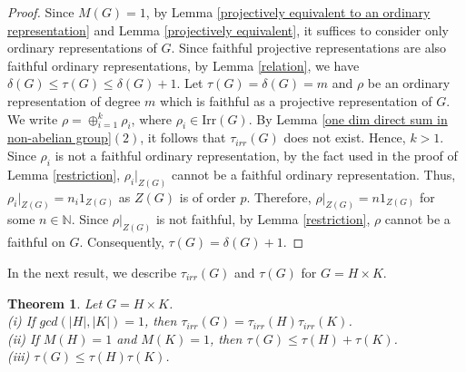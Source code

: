 \documentclass[a4paper,11pt]{amsart}
\numberwithin{equation}{section}
\numberwithin{equation}{subsection}
\newtheorem{theorem}{Theorem}[section]
\newcommand{\dg}{\delta(G)}
\newcommand{\tg}{\tau(G)}
\begin{document}
	\begin{proof}
		
		Since $M(G)=1$, by Lemma \ref{projectively equivalent to an ordinary representation} and Lemma \ref{projectively equivalent}, it suffices to consider only ordinary representations of $G$.
		Since faithful projective representations are also faithful ordinary representations, by Lemma \ref{relation}, we have $\dg \leq \tau(G) \leq \dg+1$. Let $\tau(G)= \dg = m$ and $\rho$ be an ordinary representation of degree $m$ which is faithful as a projective representation of $G$. We write $\rho = \oplus_{i=1}^k \rho_i$, where $\rho_i \in \mathrm{Irr}(G)$. By Lemma \ref{one dim direct sum in non-abelian group}$(2)$, it follows that $\tau_{irr}(G)$ does not exist. Hence, $k > 1$. 
		Since $\rho_i$ is not a faithful ordinary representation, by the fact used in the proof of Lemma \ref{restriction}, $\rho_i|_{Z(G)}$ cannot be a faithful ordinary representation. Thus, $\rho_i|_{Z(G)}= n_i 1_{Z(G)}$ as $Z(G)$ is of order $p$. Therefore, $\rho|_{Z(G)}= n 1_{Z(G)}$ for some $n \in \mathbb N$. Since $\rho|_{Z(G)}$ is not faithful, by Lemma \ref{restriction}, $\rho$ cannot be a faithful on $G$. Consequently, $\tau(G)= \delta(G)+1$. 
		
	\end{proof}
	In the next result, we describe $\tau_{irr}(G)$ and $\tg$ for $G= H \times K$. %
	
	
	
	\begin{theorem} \label{projective irreducible embedding degree for direct product} Let $G = H \times K$. \\
		(i) If $gcd(|H|,|K|)=1$, then \textbf{$\tau_{irr}(G) = \tau_{irr}(H) \tau_{irr}(K)$}.   \\
		(ii) If $M(H)= 1$ and $M(K)= 1$, then \textbf{$\tau(G) \leq \tau(H) + \tau(K)$}. \\
		(iii) \textbf{$\tau(G) \leq \tau(H) \tau(K)$}.    
	\end{theorem}
	
\end{document}
